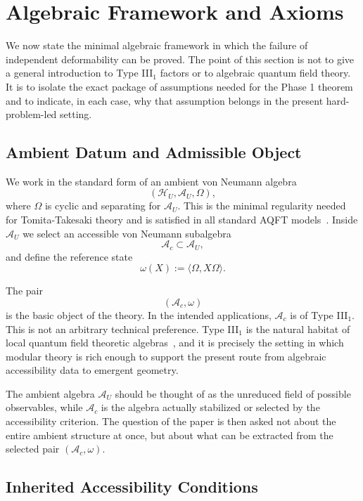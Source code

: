 \documentclass[12pt]{article}
\theoremstyle{definition}
\theoremstyle{remark}
\begin{document}
\section{Algebraic Framework and
Axioms}\label{algebraic-framework-and-axioms}

We now state the minimal algebraic framework in which the failure of
independent deformability can be proved. The point of this section is
not to give a general introduction to Type III\(_1\) factors or to
algebraic quantum field theory. It is to isolate the exact package of
assumptions needed for the Phase 1 theorem and to indicate, in each
case, why that assumption belongs in the present hard-problem-led
setting.

\subsection{Ambient Datum and Admissible
Object}\label{ambient-datum-and-admissible-object}

We work in the standard form of an ambient von Neumann algebra \[
(\mathcal{H}_U,\mathcal{A}_U,\Omega),
\] where \(\Omega\) is cyclic and separating for \(\mathcal{A}_U\).
This is the minimal regularity needed for Tomita-Takesaki theory and is
satisfied in all standard AQFT models~\cite{Haag1996}.
Inside \(\mathcal{A}_U\) we select an accessible von Neumann subalgebra
\[
\mathcal{A}_c\subset \mathcal{A}_U,
\] and define the reference state \[
\omega(X):=\langle \Omega, X\Omega\rangle.
\]

The pair \[
(\mathcal{A}_c,\omega)
\] is the basic object of the theory. In the intended applications,
\(\mathcal{A}_c\) is of Type III\(_1\). This is not an arbitrary
technical preference. Type III\(_1\) is the natural habitat of local
quantum field theoretic algebras~\cite{Haag1996}, and it is precisely the setting in
which modular theory is rich enough to support the present route from
algebraic accessibility data to emergent geometry.

The ambient algebra \(\mathcal{A}_U\) should be thought of as the
unreduced field of possible observables, while \(\mathcal{A}_c\) is the
algebra actually stabilized or selected by the accessibility criterion.
The question of the paper is then asked not about the entire ambient
structure at once, but about what can be extracted from the selected
pair \((\mathcal{A}_c,\omega)\).

\subsection{Inherited Accessibility
Conditions}\label{inherited-accessibility-conditions}
\end{document}
